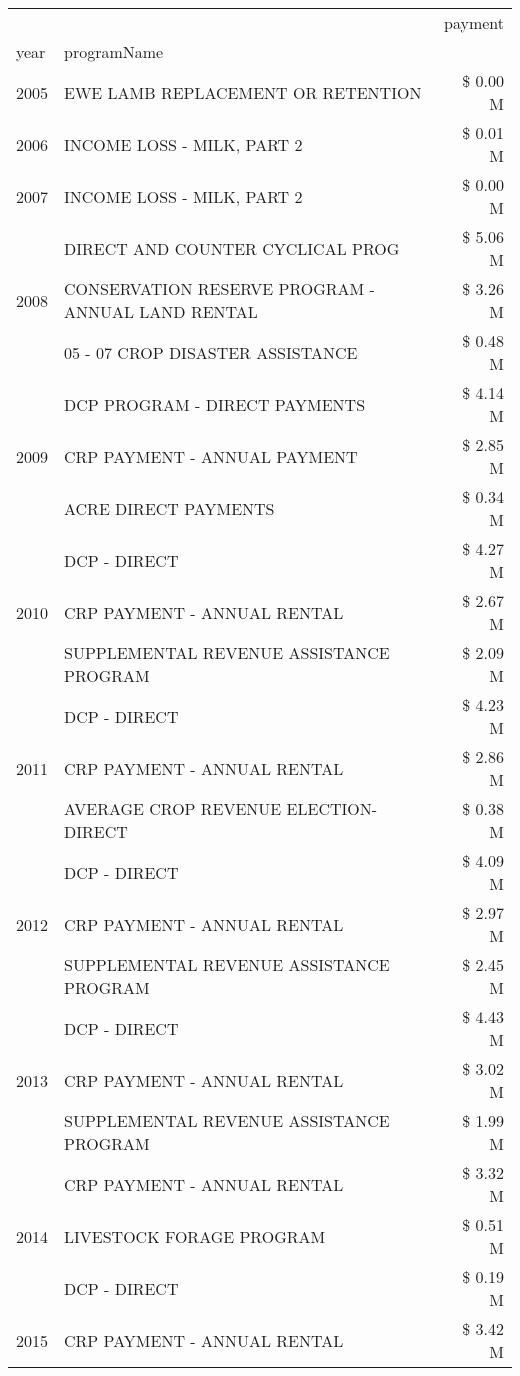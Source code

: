 \begin{tabular}{llr}
\toprule
 &  & payment \\
year & programName &  \\
\midrule
2005 & EWE LAMB REPLACEMENT OR RETENTION & \$ 0.00 M \\
\cline{1-3}
2006 & INCOME LOSS - MILK, PART 2 & \$ 0.01 M \\
\cline{1-3}
2007 & INCOME LOSS - MILK, PART 2 & \$ 0.00 M \\
\cline{1-3}
\multirow[t]{3}{*}{2008} & DIRECT AND COUNTER CYCLICAL PROG & \$ 5.06 M \\
 & CONSERVATION RESERVE PROGRAM - ANNUAL LAND RENTAL & \$ 3.26 M \\
 & 05 - 07 CROP DISASTER ASSISTANCE & \$ 0.48 M \\
\cline{1-3}
\multirow[t]{3}{*}{2009} & DCP PROGRAM - DIRECT PAYMENTS & \$ 4.14 M \\
 & CRP PAYMENT - ANNUAL PAYMENT & \$ 2.85 M \\
 & ACRE DIRECT PAYMENTS & \$ 0.34 M \\
\cline{1-3}
\multirow[t]{3}{*}{2010} & DCP - DIRECT & \$ 4.27 M \\
 & CRP PAYMENT - ANNUAL RENTAL & \$ 2.67 M \\
 & SUPPLEMENTAL REVENUE ASSISTANCE PROGRAM & \$ 2.09 M \\
\cline{1-3}
\multirow[t]{3}{*}{2011} & DCP - DIRECT & \$ 4.23 M \\
 & CRP PAYMENT - ANNUAL RENTAL & \$ 2.86 M \\
 & AVERAGE CROP REVENUE ELECTION-DIRECT & \$ 0.38 M \\
\cline{1-3}
\multirow[t]{3}{*}{2012} & DCP - DIRECT & \$ 4.09 M \\
 & CRP PAYMENT - ANNUAL RENTAL & \$ 2.97 M \\
 & SUPPLEMENTAL REVENUE ASSISTANCE PROGRAM & \$ 2.45 M \\
\cline{1-3}
\multirow[t]{3}{*}{2013} & DCP - DIRECT & \$ 4.43 M \\
 & CRP PAYMENT - ANNUAL RENTAL & \$ 3.02 M \\
 & SUPPLEMENTAL REVENUE ASSISTANCE PROGRAM & \$ 1.99 M \\
\cline{1-3}
\multirow[t]{3}{*}{2014} & CRP PAYMENT - ANNUAL RENTAL & \$ 3.32 M \\
 & LIVESTOCK FORAGE PROGRAM & \$ 0.51 M \\
 & DCP - DIRECT & \$ 0.19 M \\
\cline{1-3}
\multirow[t]{3}{*}{2015} & CRP PAYMENT - ANNUAL RENTAL & \$ 3.42 M \\

\end{tabular}
